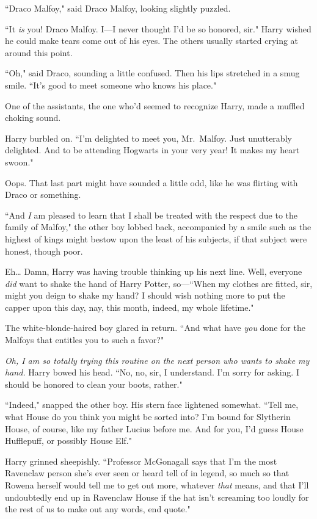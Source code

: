``Draco Malfoy," said Draco Malfoy, looking slightly puzzled.

``It \emph{is} you! Draco Malfoy. I---I never thought I'd be so honored, sir." Harry wished he could make tears come out of his eyes. The others usually started crying at around this point.

``Oh," said Draco, sounding a little confused. Then his lips stretched in a smug smile. ``It's good to meet someone who knows his place."

One of the assistants, the one who'd seemed to recognize Harry, made a muffled choking sound.

Harry burbled on. ``I'm delighted to meet you, Mr.~Malfoy. Just unutterably delighted. And to be attending Hogwarts in your very year! It makes my heart swoon."

Oops. That last part might have sounded a little odd, like he was flirting with Draco or something.

``And \emph{I} am pleased to learn that I shall be treated with the respect due to the family of Malfoy," the other boy lobbed back, accompanied by a smile such as the highest of kings might bestow upon the least of his subjects, if that subject were honest, though poor.

Eh{\ldots} Damn, Harry was having trouble thinking up his next line. Well, everyone \emph{did} want to shake the hand of Harry Potter, so---``When my clothes are fitted, sir, might you deign to shake my hand? I should wish nothing more to put the capper upon this day, nay, this month, indeed, my whole lifetime."

The white-blonde-haired boy glared in return. ``And what have \emph{you} done for the Malfoys that entitles you to such a favor?"

\emph{Oh, I am so totally trying this routine on the next person who wants to shake my hand.} Harry bowed his head. ``No, no, sir, I understand. I'm sorry for asking. I should be honored to clean your boots, rather."

``Indeed," snapped the other boy. His stern face lightened somewhat. ``Tell me, what House do you think you might be sorted into? I'm bound for Slytherin House, of course, like my father Lucius before me. And for you, I'd guess House Hufflepuff, or possibly House Elf."

Harry grinned sheepishly. ``Professor McGonagall says that I'm the most Ravenclaw person she's ever seen or heard tell of in legend, so much so that Rowena herself would tell me to get out more, whatever \emph{that} means, and that I'll undoubtedly end up in Ravenclaw House if the hat isn't screaming too loudly for the rest of us to make out any words, end quote."

